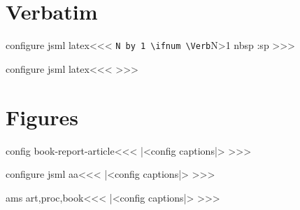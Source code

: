 \section{Verbatim}

\<configure jsml latex\><<<
   {\HAdvance\Verb:N by 1 \ifnum \Verb:N>1 
      \:nbsp \fi}
   {\a:sp}
\def\env:verb#1{\ifinner\else \vfill\break\fi
  \IgnorePar\EndP  \HAssign\Verb:N=0
  \HCode{<PARA><div class="#1"\a:LRdir>%
    \add:description{added-description}{begin verbatim}%
    <PROS \a:verbatim::style >}\EndNoFonts}
\def\endenv:verb{\NoFonts
  \EndP \ht:special{t4ht=</PROS>%
    \add:description{added-description}{end verbatim}%
    </div></PARA>}|<try inline par|>}
>>>


\<configure jsml latex\><<<
   {}
   {}
>>>




% 
% 





\section{Figures}


\<config book-report-article\><<<
|<config captions|>
>>>

\<configure jsml aa\><<<   
|<config captions|>
>>>

\<ams art,proc,book\><<<
|<config captions|>
>>>





